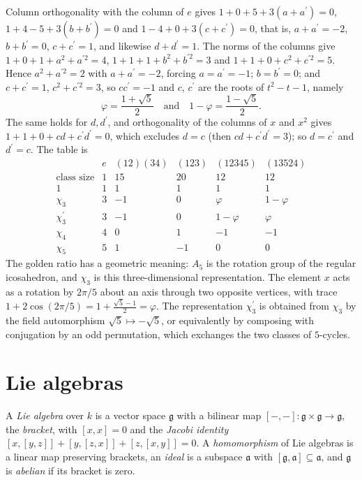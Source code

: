 \begin{example}
Column orthogonality with the column of $e$ gives $1 + 0 + 5 + 3(a + a^{\prime}) = 0$, $1 + 4 - 5 + 3(b + b^{\prime}) = 0$ and $1 - 4 + 0 + 3(c + c^{\prime}) = 0$, that is,
$a + a^{\prime} = -2$, $b + b^{\prime} = 0$, $c + c^{\prime} = 1$, and likewise $d + d^{\prime} = 1$. The norms of the columns give $1 + 0 + 1 + a^2 + a^{\prime2} = 4$, $1 + 1 + 1 + b^2 + b^{\prime2} = 3$ and
$1 + 1 + 0 + c^2 + c^{\prime2} = 5$. Hence $a^2 + a^{\prime2} = 2$ with $a + a^{\prime} = -2$, forcing $a = a^{\prime} = -1$; $b = b^{\prime} = 0$; and $c + c^{\prime} = 1$, $c^2 + c^{\prime2} = 3$, so $cc^{\prime} = -1$
and $c$, $c^{\prime}$ are the roots of $t^2 - t - 1$, namely
\[
\varphi = \frac{1 + \sqrt5}{2} \quad\text{and}\quad 1 - \varphi = \frac{1 - \sqrt5}{2}.
\]
The same holds for $d, d^{\prime}$, and orthogonality of the columns of $x$ and $x^2$ gives $1 + 1 + 0 + cd + c^{\prime}d^{\prime} = 0$, which excludes $d = c$ (then $cd + c^{\prime}d^{\prime} = 3$); so $d = c^{\prime}$ and
$d^{\prime} = c$. The table is
\[
\begin{array}{c|ccccc}
 & e & (12)(34) & (123) & (12345) & (13524)\\
\text{class size} & 1 & 15 & 20 & 12 & 12\\
\hline
1 & 1 & 1 & 1 & 1 & 1\\
\chi_3 & 3 & -1 & 0 & \varphi & 1 - \varphi\\
\chi_3^{\prime} & 3 & -1 & 0 & 1 - \varphi & \varphi\\
\chi_4 & 4 & 0 & 1 & -1 & -1\\
\chi_5 & 5 & 1 & -1 & 0 & 0
\end{array}
\]
The golden ratio has a geometric meaning: $A_5$ is the rotation group of the regular icosahedron, and $\chi_3$ is this three-dimensional representation. The element $x$ acts
as a rotation by $2\pi/5$ about an axis through two opposite vertices, with trace $1 + 2\cos(2\pi/5) = 1 + \frac{\sqrt5 - 1}{2} = \varphi$. The representation $\chi_3^{\prime}$ is obtained
from $\chi_3$ by the field automorphism $\sqrt5 \mapsto -\sqrt5$, or equivalently by composing with conjugation by an odd permutation, which exchanges the two classes of
$5$-cycles.
\end{example}

\section{Lie algebras}\label{representation-theory:section-lie-algebras}

\begin{definition}\label{representation-theory:definition-lie-algebra}
A \emph{Lie algebra} over $k$ is a vector space $\mathfrak{g}$ with a bilinear map
$[-, -] \colon \mathfrak{g} \times \mathfrak{g} \to \mathfrak{g}$, the \emph{bracket}, with $[x, x] = 0$ and the
\emph{Jacobi identity} $[x, [y, z]] + [y, [z, x]] + [z, [x, y]] = 0$. A \emph{homomorphism} of Lie algebras is a
linear map preserving brackets, an \emph{ideal} is a subspace $\mathfrak{a}$ with
$[\mathfrak{g}, \mathfrak{a}] \subseteq \mathfrak{a}$, and $\mathfrak{g}$ is \emph{abelian} if its bracket is zero.
\end{definition}

